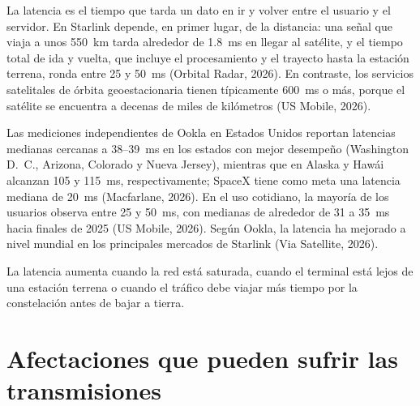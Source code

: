 \documentclass[12pt,letterpaper]{article}
\begin{document}
La latencia es el tiempo que tarda un dato en ir y volver entre el usuario y el servidor. En Starlink depende, en primer lugar, de la distancia: una señal que viaja a unos 550~km tarda alrededor de 1.8~ms en llegar al satélite, y el tiempo total de ida y vuelta, que incluye el procesamiento y el trayecto hasta la estación terrena, ronda entre 25 y 50~ms (Orbital Radar, 2026). En contraste, los servicios satelitales de órbita geoestacionaria tienen típicamente 600~ms o más, porque el satélite se encuentra a decenas de miles de kilómetros (US Mobile, 2026).

Las mediciones independientes de Ookla en Estados Unidos reportan latencias medianas cercanas a 38--39~ms en los estados con mejor desempeño (Washington D.~C., Arizona, Colorado y Nueva Jersey), mientras que en Alaska y Hawái alcanzan 105 y 115~ms, respectivamente; SpaceX tiene como meta una latencia mediana de 20~ms (Macfarlane, 2026). En el uso cotidiano, la mayoría de los usuarios observa entre 25 y 50~ms, con medianas de alrededor de 31 a 35~ms hacia finales de 2025 (US Mobile, 2026). Según Ookla, la latencia ha mejorado a nivel mundial en los principales mercados de Starlink (Via Satellite, 2026).

La latencia aumenta cuando la red está saturada, cuando el terminal está lejos de una estación terrena o cuando el tráfico debe viajar más tiempo por la constelación antes de bajar a tierra.

\section{Afectaciones que pueden sufrir las transmisiones}
\end{document}
